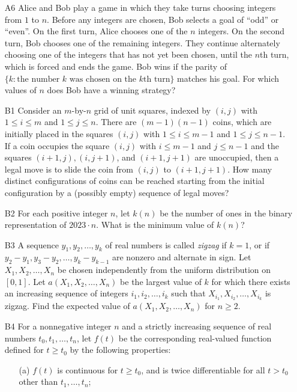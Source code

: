\documentclass[amssymb,twocolumn,pra,10pt,aps,nofootinbib]{revtex4-1}
\begin{document}
\begin{itemize}
\item[A6] Alice and Bob play a game in which they take turns choosing integers from $1$ to $n$. Before any integers are chosen, Bob selects a goal of ``odd'' or ``even''. On the first turn, Alice chooses one of the $n$ integers. On the second turn, Bob chooses one of the remaining integers. They continue alternately choosing one of the integers that has not yet been chosen, until the $n$th turn, which is forced and ends the game. Bob wins if the parity of $\{k\colon \mbox{the number $k$ was chosen on the $k$th turn}\}$ matches his goal. For which values of $n$ does Bob have a winning strategy?

\item[B1] Consider an $m$-by-$n$ grid of unit squares, indexed by $(i,j)$ with $1 \leq i \leq m$ and $1 \leq j \leq n$. There are $(m-1)(n-1)$ coins, which are initially placed in the squares $(i,j)$ with $1 \leq i \leq m-1$ and $1 \leq j \leq n-1$. If a coin occupies the square $(i,j)$ with $i \leq m-1$ and $j \leq n-1$ and the squares $(i+1,j), (i,j+1)$, and $(i+1,j+1)$ are unoccupied, then a legal move is to slide the coin from $(i,j)$ to $(i+1,j+1)$. How many distinct configurations of coins can be reached starting from the initial configuration by a (possibly empty) sequence of legal moves?

\item[B2] For each positive integer $n$, let $k(n)$ be the number of ones in the binary representation of $2023 \cdot n$. What is the minimum value of $k(n)$?

\item[B3] A sequence $y_1,y_2,\dots,y_k$ of real numbers is called \emph{zigzag} if $k=1$, or if $y_2-y_1, y_3-y_2, \dots, y_k-y_{k-1}$ are nonzero and alternate in sign. Let $X_1,X_2,\dots,X_n$ be chosen independently from the uniform distribution on $[0,1]$. Let $a(X_1,X_2,\dots,X_n)$ be the largest value of $k$ for which there exists an increasing sequence of integers $i_1,i_2,\dots,i_k$ such that $X_{i_1},X_{i_2},\dots,X_{i_k}$ is zigzag. Find the expected value of $a(X_1,X_2,\dots,X_n)$ for $n \geq 2$.

\item[B4] For a nonnegative integer $n$ and a strictly increasing sequence of real numbers $t_0,t_1,\dots,t_n$, let $f(t)$ be the corresponding real-valued function defined for $t \geq t_0$ by the following properties: 
\begin{enumerate}


\item[(a)] $f(t)$ is continuous for $t \geq t_0$, and is twice differentiable for all $t>t_0$ other than $t_1,\dots,t_n$;


\end{enumerate}
\end{itemize}
\end{document}
